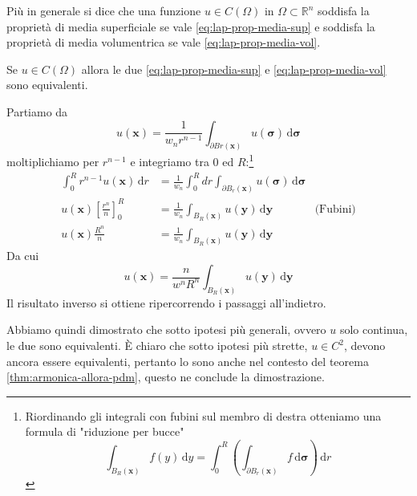 \documentclass[10pt,a4paper,twoside,openright]{book}
\newcommand{\x}{\mathbf{x}}
\newcommand{\y}{\mathbf{y}}
\newcommand{\sigg}{\bm{\sigma}}
\newcommand{\de}{\,\mathrm d}
\newcommand{\dy}{\de y}
\newcommand{\dr}{\de r}
\newcommand{\dyy}{\de \y}
\newcommand{\dsig}{\de \sigg}
\begin{document}
\begin{definition}[PDM]
    Più in generale si dice che una funzione $u\in C(\Omega)$ in $\Omega \subset \mathbb{R}^{n}$ soddisfa la proprietà di media superficiale se vale \eqref{eq:lap-prop-media-sup} e soddisfa la proprietà di media volumentrica se vale \eqref{eq:lap-prop-media-vol}.
\end{definition}
\begin{theorem}
    Se $u\in C(\Omega)$ allora le due \eqref{eq:lap-prop-media-sup} e \eqref{eq:lap-prop-media-vol} sono equivalenti.
\end{theorem}
\begin{dimostrazione}
    Partiamo da
    \begin{equation*}
        u(\x) =\frac{1}{w_{n} r^{n-1}}\int _{\partial Br(\x)} u(\sigg) \dsig
    \end{equation*}
    moltiplichiamo per $r^{n-1}$ e integriamo tra $0$ ed $R$:\footnote{Riordinando gli integrali con fubini sul membro di destra otteniamo una formula di "riduzione per bucce"
        \begin{equation*}
            \int _{B_{R}(\x)} f(y) \dy=\int _{0}^{R}\left(\int _{\partial B_{r}(\x)} f\dsig \right) \dr
        \end{equation*}
    }
    \begin{align*}
        \int _{0}^{R} r^{n-1} u(\x) \dr           & =\frac{1}{w_{n}}\int _{0}^{R} dr\int _{\partial B_{r}(\x)} u(\sigg) \dsig &                 \\
        u(\x)\left[\frac{r^{n}}{n}\right]_{0}^{R} & =\frac{1}{w_{n}}\int _{B_{R}(\x)} u(\y) \dyy                              & \text{(Fubini)} \\
        u(\x)\frac{R^{n}}{n}                      & =\frac{1}{w_{n}}\int _{B_{R}(\x)} u(\y) \dyy                              &
    \end{align*}
    Da cui
    \begin{equation*}
        u(\x) =\frac{n}{w^{n} R^{n}}\int _{B_{R}(\x)} u(\y) \dyy
    \end{equation*}
    Il risultato inverso si ottiene ripercorrendo i passaggi all'indietro.
\end{dimostrazione}
Abbiamo quindi dimostrato che sotto ipotesi più generali, ovvero $u$ solo continua, le due sono equivalenti. È chiaro che sotto ipotesi più strette, $u\in C^{2}$, devono ancora essere equivalenti, pertanto lo sono anche nel contesto del teorema \ref{thm:armonica-allora-pdm}, questo ne conclude la dimostrazione.
\end{document}
